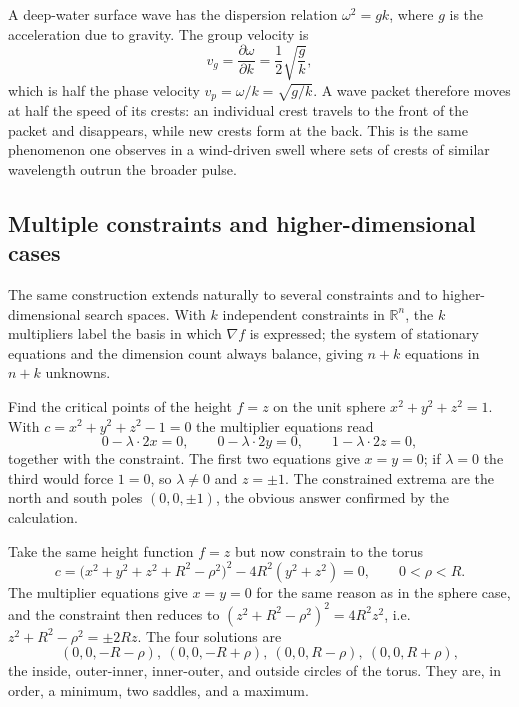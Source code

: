 \begin{example}
A deep-water surface wave has the dispersion relation $\omega^2=gk$, where $g$ is the acceleration due to gravity. The group velocity is
\begin{equation}
v_g=\frac{\partial\omega}{\partial k}=\frac12\sqrt{\frac{g}{k}},
\end{equation}
which is half the phase velocity $v_p=\omega/k=\sqrt{g/k}$. A wave packet therefore moves at half the speed of its crests: an individual crest travels to the front of the packet and disappears, while new crests form at the back. This is the same phenomenon one observes in a wind-driven swell where sets of crests of similar wavelength outrun the broader pulse.
\end{example}

\subsection{Multiple constraints and higher-dimensional cases}

The same construction extends naturally to several constraints and to higher-dimensional search spaces. With $k$ independent constraints in $\mathbb{R}^n$, the $k$ multipliers label the basis in which $\nabla f$ is expressed; the system of stationary equations and the dimension count always balance, giving $n+k$ equations in $n+k$ unknowns.

\begin{example}
Find the critical points of the height $f=z$ on the unit sphere $x^2+y^2+z^2=1$. With $c=x^2+y^2+z^2-1=0$ the multiplier equations read
\begin{equation}
0-\lambda\cdot 2x=0,
\qquad 0-\lambda\cdot 2y=0,
\qquad 1-\lambda\cdot 2z=0,
\end{equation}
together with the constraint. The first two equations give $x=y=0$; if $\lambda=0$ the third would force $1=0$, so $\lambda\neq 0$ and $z=\pm 1$. The constrained extrema are the north and south poles $(0,0,\pm 1)$, the obvious answer confirmed by the calculation.
\end{example}

\begin{example}
Take the same height function $f=z$ but now constrain to the torus
\begin{equation}
c=\bigl(x^2+y^2+z^2+R^2-\rho^2\bigr)^2-4R^2(y^2+z^2)=0,
\qquad 0<\rho<R.
\end{equation}
The multiplier equations give $x=y=0$ for the same reason as in the sphere case, and the constraint then reduces to $(z^2+R^2-\rho^2)^2=4R^2z^2$, i.e. $z^2+R^2-\rho^2=\pm 2Rz$. The four solutions are
\begin{equation}
(0,0,-R-\rho),\ (0,0,-R+\rho),\ (0,0,R-\rho),\ (0,0,R+\rho),
\end{equation}
the inside, outer-inner, inner-outer, and outside circles of the torus. They are, in order, a minimum, two saddles, and a maximum.
\end{example}

